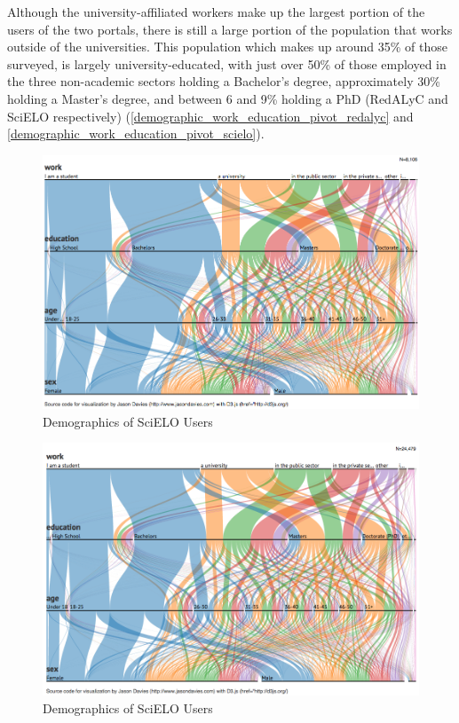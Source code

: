 Although the university-affiliated workers make up the largest portion of the users of the two portals, there is still a large portion of the population that works outside of the universities. This population which makes up around 35\% of those surveyed, is largely university-educated, with just over 50\% of those employed in the three non-academic sectors holding a Bachelor's degree, approximately 30\% holding a Master's degree, and between 6 and 9\% holding a PhD (RedALyC and SciELO respectively) (\autoref{demographic_work_education_pivot_redalyc} and \autoref{demographic_work_education_pivot_scielo}).

\begin{figure}[htbp]
\centering
\includegraphics[keepaspectratio,width=\textwidth,height=0.75\textheight]{figures/demographic_parallel_coordinates_redalyc.png}
\caption{Demographics of SciELO Users}
\label{demographic_parallel_coordinates_redalyc}
\end{figure}

\begin{figure}[htbp]
\centering
\includegraphics[keepaspectratio,width=\textwidth,height=0.75\textheight]{figures/demographic_parallel_coordinates_scielo.png}
\caption{Demographics of SciELO Users}
\label{demographic_parallel_coordinates_scielo}
\end{figure}



